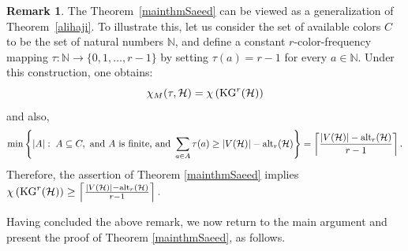 \documentclass[11pt]{amsart}
\theoremstyle{definition}
\newtheorem{remark}{Remark}
\begin{document}
\begin{remark}
	The Theorem~\ref{mainthmSaeed} can be viewed as a generalization of Theorem~\ref{alihaji}. To illustrate this, let us consider the set of available colors $C$ to be the set of natural numbers
	$\mathbb{N}$, and define a constant $r$-color-frequency mapping $\tau: \mathbb{N} \longrightarrow \{0,1,\ldots,r-1\}$ by setting $\tau(a) = r-1$ for every $a \in \mathbb{N}$. Under this construction, one obtains:
	$$\chi_M(\tau, {\mathcal H})=\chi\left({\rm KG}^r({\mathcal H})\right)$$
	and also,
	$$\min\left\{|A|:\;   A \subseteq C, \mbox{ and } A \mbox{ is finite,}  \mbox{ and } \sum_{a\in A}\tau(a) \geq  |V({\mathcal H})|-{\rm alt}_r({\mathcal H})\right\}=\left\lceil{ |V({\mathcal H})|-{\rm alt}_r({\mathcal H})\over r-1}\right\rceil.$$
	Therefore, the assertion of Theorem \ref{mainthmSaeed} implies 
	$\chi\left({\rm KG}^r({\mathcal H})\right)\geq \left\lceil{ |V({\mathcal H})|-{\rm alt}_r({\mathcal H})\over r-1}\right\rceil.$
\end{remark}

Having concluded the above remark, we now return to the main argument and present the proof of Theorem \ref{mainthmSaeed}, as follows.
\end{document}
